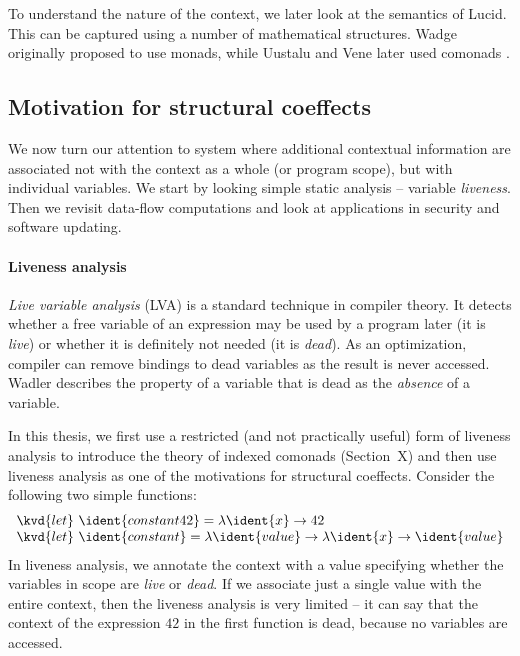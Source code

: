 To understand the nature of the context, we later look at the semantics of Lucid. This can be
captured using a number of mathematical structures. Wadge \cite{app-lucid-monads} originally 
proposed to use monads, while Uustalu and Vene later used comonads \cite{app-dataflow-essence}.


\subsection{Motivation for structural coeffects}

We now turn our attention to system where additional contextual information are associated not
with the context as a whole (or program scope), but with individual variables. We start by looking
simple static analysis -- variable \emph{liveness}. Then we revisit data-flow computations and
look at applications in security and software updating.


\paragraph{Liveness analysis}

\emph{Live variable analysis} (LVA) \cite{app-modern-compiler} is a standard technique in compiler theory. 
It detects whether a free variable of an expression may be used by a program later (it is
\emph{live}) or whether it is definitely not needed (it is \emph{dead}). As an optimization, 
compiler can remove bindings to dead variables as the result is never accessed. Wadler 
\cite{app-strictness-absecnce} describes the property of a variable that is dead as the 
\emph{absence} of a variable. 

In this thesis, we first use a restricted (and not practically useful) form of liveness analysis
to introduce the theory of indexed comonads (Section~X) and then use liveness analysis as one of the
motivations for structural coeffects. Consider the following two simple functions:
%
\begin{equation*}
\begin{array}{l}
\kvd{let}~\ident{constant42} = \lambda \ident{x} \rightarrow 42\\
\kvd{let}~\ident{constant} = \lambda \ident{value} \rightarrow \lambda \ident{x} \rightarrow \ident{value}
\end{array}
\end{equation*}
%
In liveness analysis, we annotate the context with a value specifying whether the variables in
scope are \emph{live} or \emph{dead}. If we associate just a single value with the entire 
context, then the liveness analysis is very limited -- it can say that the context of the 
expression $42$ in the first function is dead, because no variables are accessed. 

